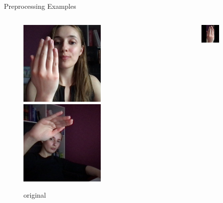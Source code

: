\documentclass[aspectratio=169]{beamer}
\begin{document}
{\begin{frame}{Preprocessing Examples}
\begin{columns}[c]
    \begin{column}{.33\textwidth}
    \begin{figure}
        \centering
        \includegraphics[width=0.6\textwidth]{img/test/nasmi_203.png}
        \includegraphics[width=0.6\textwidth]{img/test/nasmi_304.png}
        \caption{original}
    \end{figure}      
    \end{column}

    \begin{column}{.33\textwidth}
    \begin{figure}
        \centering
        \includegraphics[width=0.6\textwidth]{img/cropped/nasmi_203.png}
        

\end{figure}
\end{column}
\end{columns}
\end{frame}}
\end{document}
